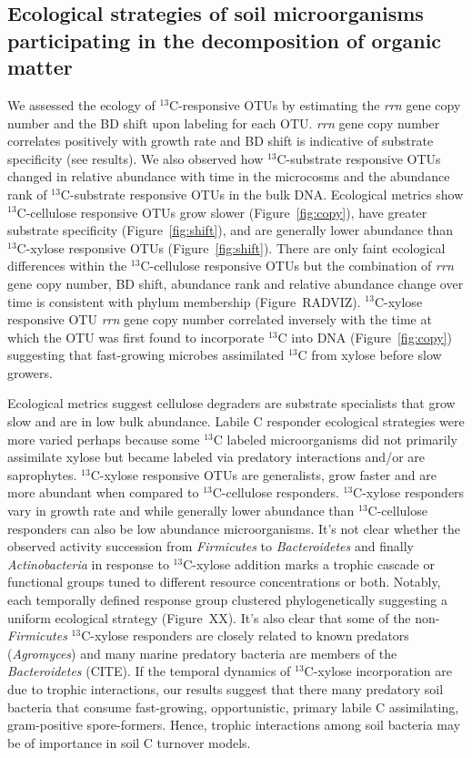 \subsection{Ecological strategies of soil microorganisms participating in the
decomposition of organic matter}
We assessed the ecology of $^{13}$C-responsive OTUs by estimating the
\textit{rrn} gene copy number and the BD shift upon labeling for each OTU.
\textit{rrn} gene copy number correlates positively with growth rate
\citep{11125085} and BD shift is indicative of substrate specificity (see
results). We also observed how $^{13}$C-substrate responsive OTUs changed in
relative abundance with time in the microcosms and the abundance rank of
$^{13}$C-substrate responsive OTUs in the bulk DNA. Ecological metrics show
$^{13}$C-cellulose responsive OTUs grow slower (Figure~\ref{fig:copy}), have
greater substrate specificity (Figure~\ref{fig:shift}), and are generally lower
abundance than $^{13}$C-xylose responsive OTUs (Figure~\ref{fig:shift}). There
are only faint ecological differences within the $^{13}$C-cellulose responsive
OTUs but the combination of \textit{rrn} gene copy number, BD shift, abundance
rank and relative abundance change over time is consistent with phylum
membership (Figure~RADVIZ). $^{13}$C-xylose responsive OTU \textit{rrn} gene
copy number correlated inversely with the time at which the OTU was first
found to incorporate $^{13}$C into DNA (Figure~\ref{fig:copy}) suggesting that
fast-growing microbes assimilated $^{13}$C from xylose before slow growers.  

Ecological metrics suggest cellulose degraders are substrate specialists that
grow slow and are in low bulk abundance. Labile C responder ecological
strategies were more varied perhaps because some $^{13}$C labeled
microorganisms did not primarily assimilate xylose but became labeled via
predatory interactions and/or are saprophytes. $^{13}$C-xylose responsive OTUs
are generalists, grow faster and are more abundant when compared to
$^{13}$C-cellulose responders. $^{13}$C-xylose responders vary in growth rate
and while generally lower abundance than $^{13}$C-cellulose responders can also
be low abundance microorganisms. It's not clear whether the observed activity
succession from \textit{Firmicutes} to \textit{Bacteroidetes} and finally
\textit{Actinobacteria} in response to $^{13}$C-xylose addition marks a trophic
cascade or functional groups tuned to different resource concentrations or
both. Notably, each temporally defined response group clustered
phylogenetically suggesting a uniform ecological strategy (Figure~XX). It's
also clear that some of the non-\textit{Firmicutes} $^{13}$C-xylose responders
are closely related to known predators (\textit{Agromyces}) and many marine
predatory bacteria are members of the \textit{Bacteroidetes} (CITE). If the
temporal dynamics of $^{13}$C-xylose incorporation are due to trophic
interactions, our results suggest that there many predatory soil bacteria that
consume fast-growing, opportunistic, primary labile C assimilating,
gram-positive spore-formers. Hence, trophic interactions among soil bacteria
may be of importance in soil C turnover models.

